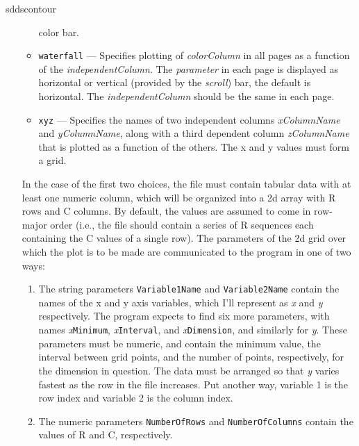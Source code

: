 \begin{sddsprog}{sddscontour}
\begin{itemize}
\begin{itemize}
        color bar. 
        \item \verb|waterfall| --- Specifies plotting of {\em colorColumn} in all pages as a function of the
        {\em independentColumn}. The {\em parameter} in each page is displayed as horizontal or vertical (provided
        by the {\em scroll}) bar, the default is horizontal. The {\em independentColumn} should be the same in
        each page.
        \item \verb|xyz| --- Specifies the names of two independent columns {\em xColumnName} and {\em yColumnName}, along with 
          a third dependent column {\em zColumnName} that is plotted as a function of the others.
          The x and y values must form a grid.
        \end{itemize}

        In the case of the first two choices, the file must contain
tabular data with at least one numeric column, which will be organized
into a 2d array with R rows and C columns.  By default, the values are
assumed to come in row-major order (i.e., the file should contain a
series of R sequences each containing the C values of a single row).
The parameters of the 2d grid over which the plot is to be made are
communicated to the program in one of two ways:

\begin{enumerate}

\item The string parameters \verb|Variable1Name| and \verb|Variable2Name| contain the names of the 
x and y axis variables, which I'll represent as {\em x} and {\em y} respectively.  The program expects to find
six more parameters, with names {\em x}\verb|Minimum|, {\em x}\verb|Interval|, and {\em x}\verb|Dimension|,
and similarly for {\em y}.  These parameters must be numeric, and contain the minimum value, the interval
between grid points, and the number of points, respectively, for the dimension in question.
The data must be arranged so that {\em y} varies fastest as the row in the file increases.  Put another
way, variable 1 is the row index and variable 2 is the column index.
\item The numeric parameters \verb|NumberOfRows| and \verb|NumberOfColumns| contain the values of R and
C, respectively.
\end{enumerate}


\end{itemize}
\end{sddsprog}
